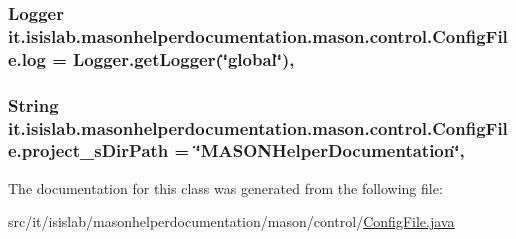 \hypertarget{classit_1_1isislab_1_1masonhelperdocumentation_1_1mason_1_1control_1_1_config_file_a1e0cc7c39d846dcf3dd9def42f836e89}{
\subsubsection[{log}]{\setlength{\rightskip}{0pt plus 5cm}Logger it.\-isislab.\-masonhelperdocumentation.\-mason.\-control.\-Config\-File.\-log = Logger.\-get\-Logger(\char`\"{}global\char`\"{})\hspace{0.3cm}{\ttfamily [static]}, {\ttfamily [private]}}}\label{classit_1_1isislab_1_1masonhelperdocumentation_1_1mason_1_1control_1_1_config_file_a1e0cc7c39d846dcf3dd9def42f836e89}
\hypertarget{classit_1_1isislab_1_1masonhelperdocumentation_1_1mason_1_1control_1_1_config_file_a693307679d18c1e5bc8830e878d12e9d}{
\subsubsection[{project\-\_\-s\-Dir\-Path}]{\setlength{\rightskip}{0pt plus 5cm}String it.\-isislab.\-masonhelperdocumentation.\-mason.\-control.\-Config\-File.\-project\-\_\-s\-Dir\-Path = \char`\"{}M\-A\-S\-O\-N\-Helper\-Documentation\char`\"{}\hspace{0.3cm}{\ttfamily [static]}, {\ttfamily [private]}}}\label{classit_1_1isislab_1_1masonhelperdocumentation_1_1mason_1_1control_1_1_config_file_a693307679d18c1e5bc8830e878d12e9d}


The documentation for this class was generated from the following file\-:\begin{DoxyCompactItemize}
\item 
src/it/isislab/masonhelperdocumentation/mason/control/\hyperlink{_config_file_8java}{Config\-File.\-java}\end{DoxyCompactItemize}
